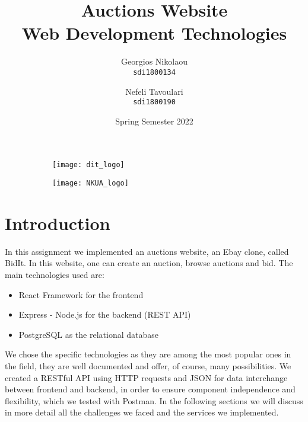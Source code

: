 \documentclass{article}
\title{%
\HUGE
 Auctions Website \\ Web Development Technologies }
\begin{document}
\author{\Large
  Georgios Nikolaou\\
   \texttt{\large sdi1800134}
  \and
  \Large
  Nefeli Tavoulari\\
   \texttt{\large sdi1800190}
}
\date{Spring Semester 2022}
\maketitle
\begin{figure}
\centering
\begin{subfigure}
  \centering
  \texttt{[image: dit\_logo]}
  \label{fig:sub1}
\end{subfigure}%
\begin{subfigure}
  \centering
  \texttt{[image: NKUA\_logo]}
  \label{fig:sub2}
\end{subfigure}
\label{fig:test}
\end{figure}


\newpage
\tableofcontents
\newpage
\section{Introduction} 
In this assignment we implemented an auctions website, an Ebay clone, called BidIt. In this website, one can create an auction, browse auctions and bid.
The main technologies used are:
\begin{itemize}
    \item React Framework for the frontend
    \item Express - Node.js for the backend (REST API)
    \item PostgreSQL as the relational database
\end{itemize}
We chose the specific technologies as they are among the most popular ones in the field, they are well documented and offer, of course, many possibilities. We created a RESTful API using HTTP requests and JSON for data interchange between frontend and backend, in order to ensure component independence and flexibility, which we tested with Postman. In the following sections we will discuss in more detail all the challenges we faced and the services we implemented.
\end{document}
